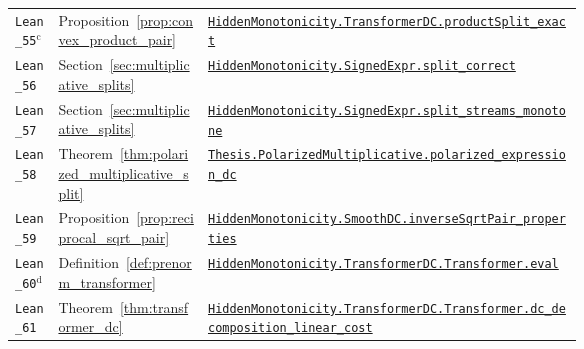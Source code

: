 {\begin{longtable}{@{}l l >{\raggedright\arraybackslash}p{0.66\linewidth}@{}}
\texttt{Lean\_55}$^{\mathrm c}$ & Proposition~\ref{prop:convex_product_pair} & \href{https://github.com/JayPiZimmermann/A-Structural-Approach-to-Explainable-Deep-Learning/blob/b1c18a7ed02eadd720b0b693794ba7e7dd2628f6/formalization/HiddenMonotonicity/PolarizedProductDC.lean\#L18}{\texttt{HiddenMonotonicity.\allowbreak TransformerDC.\allowbreak productSplit\_exact}} \\
\texttt{Lean\_56} & Section~\ref{sec:multiplicative_splits} & \href{https://github.com/JayPiZimmermann/A-Structural-Approach-to-Explainable-Deep-Learning/blob/b1c18a7ed02eadd720b0b693794ba7e7dd2628f6/formalization/HiddenMonotonicity/MultiplicativeSplit.lean\#L51}{\texttt{HiddenMonotonicity.\allowbreak SignedExpr.\allowbreak split\_correct}} \\
\texttt{Lean\_57} & Section~\ref{sec:multiplicative_splits} & \href{https://github.com/JayPiZimmermann/A-Structural-Approach-to-Explainable-Deep-Learning/blob/b1c18a7ed02eadd720b0b693794ba7e7dd2628f6/formalization/HiddenMonotonicity/MultiplicativeSplit.lean\#L103}{\texttt{HiddenMonotonicity.\allowbreak SignedExpr.\allowbreak split\_streams\_monotone}} \\
\texttt{Lean\_58} & Theorem~\ref{thm:polarized_multiplicative_split} & \href{https://github.com/JayPiZimmermann/A-Structural-Approach-to-Explainable-Deep-Learning/blob/b1c18a7ed02eadd720b0b693794ba7e7dd2628f6/formalization/Thesis/PolarizedMultiplicative.lean\#L15}{\texttt{Thesis.\allowbreak PolarizedMultiplicative.\allowbreak polarized\_expression\_dc}} \\
\texttt{Lean\_59} & Proposition~\ref{prop:reciprocal_sqrt_pair} & \href{https://github.com/JayPiZimmermann/A-Structural-Approach-to-Explainable-Deep-Learning/blob/b1c18a7ed02eadd720b0b693794ba7e7dd2628f6/formalization/HiddenMonotonicity/LayerNormDCLift.lean\#L208}{\texttt{HiddenMonotonicity.\allowbreak SmoothDC.\allowbreak inverseSqrtPair\_properties}} \\
\texttt{Lean\_60}$^{\mathrm d}$ & Definition~\ref{def:prenorm_transformer} & \href{https://github.com/JayPiZimmermann/A-Structural-Approach-to-Explainable-Deep-Learning/blob/b1c18a7ed02eadd720b0b693794ba7e7dd2628f6/formalization/HiddenMonotonicity/TransformerDefinition.lean\#L220}{\texttt{HiddenMonotonicity.\allowbreak TransformerDC.\allowbreak Transformer.\allowbreak eval}} \\
\texttt{Lean\_61} & Theorem~\ref{thm:transformer_dc} & \href{https://github.com/JayPiZimmermann/A-Structural-Approach-to-Explainable-Deep-Learning/blob/b1c18a7ed02eadd720b0b693794ba7e7dd2628f6/formalization/HiddenMonotonicity/TransformerLinearCost.lean\#L242}{\texttt{HiddenMonotonicity.\allowbreak TransformerDC.\allowbreak Transformer.\allowbreak dc\_decomposition\_linear\_cost}} \\

\end{longtable}}
